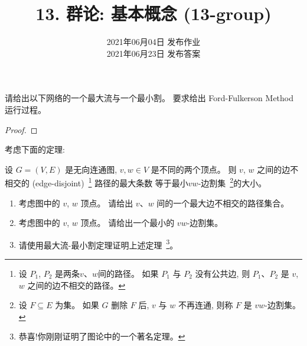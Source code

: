 \documentclass[a4paper, justified]{tufte-handout}
\title{13. 群论: 基本概念 (13-group)}
\date{2021年06月04日 发布作业 \\ 2021年06月23日 发布答案}
\begin{document}
\maketitle
\noplagiarism %
\begin{abstract}
\end{abstract}
\beginrequired

\begin{problem}
  请给出以下网络的一个最大流与一个最小割。
  要求给出 Ford-Fulkerson Method 运行过程。
\end{problem}

\begin{proof}
\end{proof}

\begin{problem}[\score{5 = 1 + 1 + 3} $\star\star\star\star$]
  考虑下面的定理:
  \begin{theorem}[不能告诉你名字的某个著名定理]
    设 $G = (V, E)$ 是无向连通图, $v, w \in V$ 是不同的两个顶点。
    则 $v$, $w$ 之间的边不相交的 (edge-disjoint)~\footnote{
      设 $P_{1}$, $P_{2}$ 是两条$v$、$w$间的路径。
      如果 $P_{1}$ 与 $P_{2}$ 没有公共边,
      则 $P_{1}$、$P_{2}$ 是 $v$, $w$ 之间的边不相交的路径。
    } 路径的最大条数
    等于最小$vw$-边割集~\footnote{
      设 $F \subseteq E$ 为集。
      如果 $G$ 删除 $F$ 后, $v$ 与 $w$ 不再连通,
      则称 $F$ 是 $vw$-边割集。
    }的大小。
  \end{theorem}


  \begin{enumerate}[(1)]
    \item 考虑图中的 $v$, $w$ 顶点。
      请给出 $v$、$w$ 间的一个最大边不相交的路径集合。
    \item 考虑图中的 $v$, $w$ 顶点。
      请给出一个最小的 $vw$-边割集。
    \item 请使用最大流-最小割定理证明上述定理~\footnote{恭喜!你刚刚证明了图论中的一个著名定理。}。
  \end{enumerate}
\end{problem}
\end{document}
